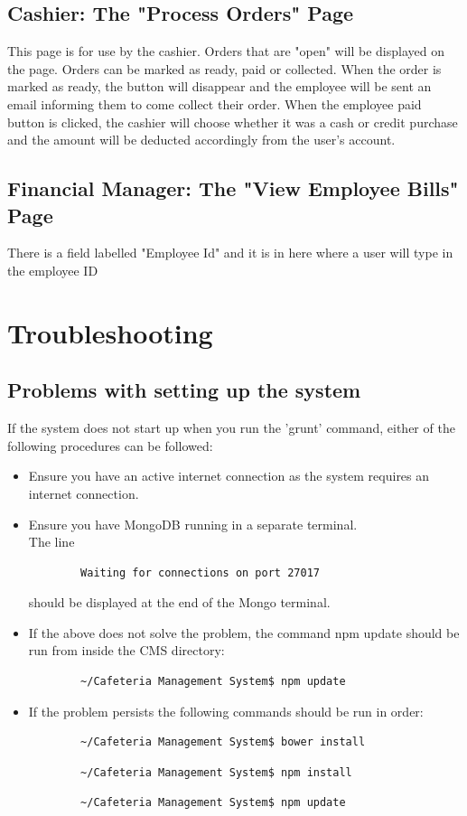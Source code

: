 \documentclass[a4paper,12pt]{article}
\begin{document}
\subsection{Cashier: The "Process Orders" Page}
This page is for use by the cashier. Orders that are "open" will be displayed on the page. Orders can be marked as ready, paid or collected. When the order is marked as ready, the button will disappear and the employee will be sent an email informing them to come collect their order. When the employee paid button is clicked, the cashier will choose whether it was a cash or credit purchase and the amount will be deducted accordingly from the user's account.

\subsection{Financial Manager: The "View Employee Bills" Page}
There is a field labelled "Employee Id" and it is in here where a user will type in the employee ID 

\section{Troubleshooting}
\subsection{Problems with setting up the system}
If the system does not start up when you run the 'grunt' command, either of the following procedures can be followed:
\begin{itemize}
\item Ensure you have an active internet connection as the system requires an internet connection.
\item Ensure you have MongoDB running in a separate terminal. \\
	The line \begin{verbatim}
		Waiting for connections on port 27017
	\end{verbatim} should be displayed at the end of the Mongo terminal.
\item If the above does not solve the problem, the command npm update should be run from inside the CMS directory:
	\begin{verbatim}
		~/Cafeteria Management System$ npm update
	\end{verbatim}
\item If the problem persists the following commands should be run in order:
	\begin{verbatim}
		~/Cafeteria Management System$ bower install
	\end{verbatim} 
	\begin{verbatim}
		~/Cafeteria Management System$ npm install
	\end{verbatim} 
	\begin{verbatim}
		~/Cafeteria Management System$ npm update
	\end{verbatim}
\end{itemize}
\end{document}
